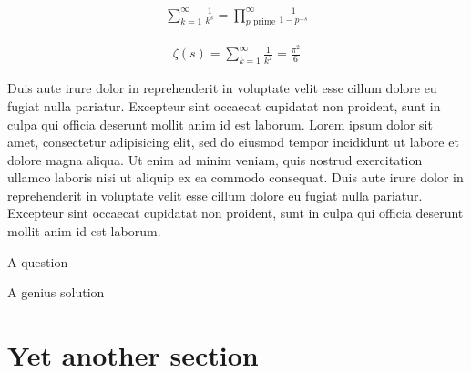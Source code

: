 \documentclass[a4paper, 12pt, twoside, dvipsnames]{article}
\newcounter{WE}
\newcounter{FO}[section]
\begin{document}
\begin{minipage}{0.49\textwidth}
    \begin{FO}
    \begin{align*}
        \sum_{k=1}^{\infty}\frac{1}{k^s} = \prod_{p \text{ prime}}^{\infty}\frac{1}{1-p^{-s}}
    \end{align*}
    \end{FO}
\end{minipage}
\hfill
\begin{minipage}{0.49\textwidth}
    \begin{FO}
    \begin{align*}
        \zeta(s)=\sum_{k=1}^{\infty}\frac{1}{k^2} = \frac{\pi^2}{6}
    \end{align*}
    \end{FO}
\end{minipage}


Duis aute irure dolor in reprehenderit in voluptate velit esse
cillum dolore eu fugiat nulla pariatur. Excepteur sint occaecat cupidatat non
proident, sunt in culpa qui officia deserunt mollit anim id est laborum. 
Lorem ipsum dolor sit amet, consectetur adipisicing elit, sed do eiusmod
tempor incididunt ut labore et dolore magna aliqua. Ut enim ad minim veniam,
quis nostrud exercitation ullamco laboris nisi ut aliquip ex ea commodo
consequat. Duis aute irure dolor in reprehenderit in voluptate velit esse
cillum dolore eu fugiat nulla pariatur. Excepteur sint occaecat cupidatat non
proident, sunt in culpa qui officia deserunt mollit anim id est laborum.
\begin{WE}
    A question

    \tcblower

    A genius solution
\end{WE}


\section{Yet another section}

\label{Lastpage}
\end{document}

